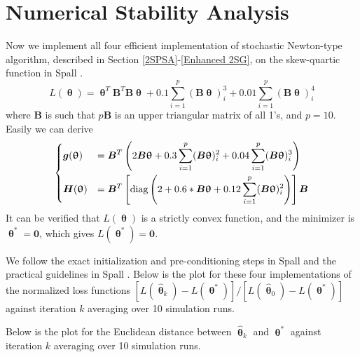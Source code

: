 \documentclass[conference]{IEEEtran}
\newcommand{\htheta}{\bm{\hat{\uptheta}}}
\begin{document}


\section{Numerical Stability Analysis}
Now we implement all four efficient implementation of stochastic Newton-type algorithm, described in Section \ref{2SPSA}-\ref{Enhanced 2SG}, on the skew-quartic function in Spall \cite{Spall2009}.
\begin{equation*}
L(\bm{\uptheta})=\bm{\uptheta}^{T}\bm{B}^{T}\bm{B}\bm{\uptheta}+0.1 \sum_{i=1}^{p}  (\bm{B}\bm{\uptheta})_i^3  +0.01 \sum_{i=1}^{p}  (\bm{B}\bm{\uptheta})_i^4
\end{equation*}
where $\bm{B}$ is such that $p\bm{B}$ is an upper triangular matrix of all 1's, and $p=10$. Easily we can derive
\begin{equation}
\begin{dcases}
	\bm{g}(\bm{\uptheta})&=\bm{B}^{T}\left( 2\bm{B}\bm{\uptheta}+0.3 \sum_{i=1}^{p}(\bm{B}\bm{\uptheta})_i^2 +0.04\sum_{i=1}^{p}(\bm{B}\bm{\uptheta})_i^3\right)\\
	\bm{H}(\bm{\uptheta})&=\bm{B}^{T}\left[\text{diag}\left(2+0.6*\bm{B}\bm{\uptheta}+0.12\sum_{i=1}^{p}(\bm{B}\bm{\uptheta})_i^2\right)\right]\bm{B}\\
\end{dcases}
\end{equation}
It can be verified that $L(\bm{\uptheta})$ is a strictly convex function, and the minimizer is $\bm{\uptheta}^{*}=\bm{0}$, which gives $L(\bm{\uptheta}^{*})=\bm{0}$.

We follow the exact initialization and pre-conditioning steps in Spall \cite{Spall2009} and the practical guidelines in Spall \cite{Spall2000}. Below is the plot for these four implementations of the normalized loss functions $[L(\htheta_k)-L(\bm{\uptheta}^{*})]/[L(\htheta_0)-L(\bm{\uptheta}^{*})]$ against iteration $k$ averaging over 10 simulation runs.


Below is the plot for the Euclidean distance between $\htheta_k$ and $\bm{\uptheta}^{*}$ against iteration $k$ averaging over 10 simulation runs.
\end{document}
